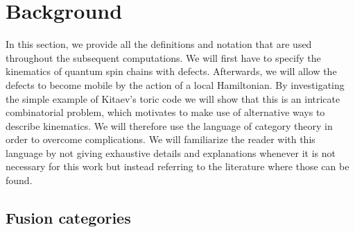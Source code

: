 \documentclass[aps,prb,twocolumn,superscriptaddress,noshowkeys]{revtex4-2}  %
\theoremstyle{plain}%
\theoremstyle{definition}
\theoremstyle{remark}
\begin{document}
\section{Background}\label{S:defs}
In this section, we provide all the definitions and notation that are used throughout the subsequent computations. We will first have to specify the kinematics of quantum spin chains with defects. Afterwards, we will allow the defects to become mobile by the action of a local Hamiltonian. By investigating the simple example of Kitaev's toric code \cite{Kit03} we will show that this is an intricate combinatorial problem, which motivates to make use of alternative ways to describe kinematics. We will therefore use the language of category theory in order to overcome complications. We will familiarize the reader with this language by not giving exhaustive details and explanations whenever it is not necessary for this work but instead referring to the literature where those can be found.

\subsection{Fusion categories}
\end{document}
